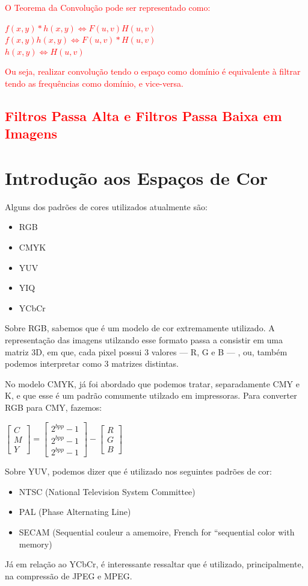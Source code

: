 \documentclass[a4paper, 12pt]{article}
\begin{document}
\textcolor{red}{
O Teorema da Convolução pode ser representado como:
\begin{center}
 $f(x,y) * h(x,y) \Leftrightarrow F(u,v)H(u,v)$
 \\
 $f(x,y)h(x,y) \Leftrightarrow F(u,v)*H(u,v)$
 \\
 $h(x,y) \Leftrightarrow H(u,v)$
\end{center}
Ou seja, realizar convolução tendo o espaço como domínio é equivalente à filtrar tendo as frequências como domínio, e vice-versa.
}
\textcolor{red}{
\section{Filtros Passa Alta e Filtros Passa Baixa em Imagens}}


\section{Introdução aos Espaços de Cor}
Alguns dos padrões de cores utilizados atualmente são:
\begin{itemize}
	\item RGB
 \item CMYK
 \item YUV
 \item YIQ
 \item YCbCr
\end{itemize}

Sobre RGB, sabemos que é um modelo de cor extremamente utilizado. A representação das imagens utilzando esse formato passa a consistir em uma matriz 
3D, em que, cada pixel possui $3$ valores --- R, G e B --- , ou, também podemos interpretar como $3$ matrizes distintas.

No modelo CMYK, já foi abordado que podemos tratar, separadamente CMY e K, e que esse é um padrão comumente utilzado em impressoras. Para converter RGB 
para CMY, fazemos: 
\begin{center}
	$
	\begin{bmatrix}
		C \\
		M \\
		Y
	\end{bmatrix}
	= 
	\begin{bmatrix}
		2^{bpp} - 1 \\
		2^{bpp} - 1 \\
		2^{bpp} - 1
	\end{bmatrix}
	- 
	\begin{bmatrix}
		R \\
		G \\
		B
	\end{bmatrix}
	$
\end{center}
Sobre YUV, podemos dizer que é utilizado nos seguintes padrões de cor:
\begin{itemize}
	\item NTSC (National Television System Committee)
 	\item PAL (Phase Alternating Line)
 	\item SECAM (Sequential couleur a amemoire, French for “sequential color with memory)
\end{itemize}
Já em relação ao YCbCr, é interessante ressaltar que é utilizado, principalmente, na compressão de JPEG e MPEG.
\end{document}
